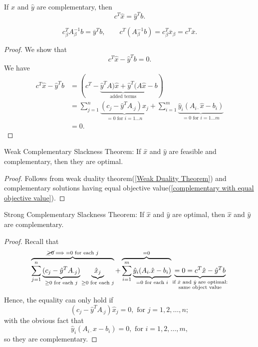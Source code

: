 \begin{theorem}
	\label{complementary with equal objective value}
	If \(\hat{x}\) and \(\hat{y}\) are complementary, then
	\[
		c^{T}\hat{x} = \hat{y}^{T} b.
	\]
\end{theorem}
\begin{note}
	\[
		c^{T}_{\beta} A^{-1}_{\beta}b = \overline{y}^{T} b,\qquad c^{T}(A^{-1}_{\beta} b) = c^{T}_{\beta}\overline{x}_{\beta} = c^{T}\overline{x}.
	\]
\end{note}
\begin{proof}
	We show that
	\[
		c^{T} \hat{x} - \hat{y}^{T} b = 0.
	\]
	We have
	\[
		\begin{split}
			c^{T} \hat{x} - \hat{y}^{T} b &= (c^{T} - \underbrace{\hat{y}^{T}A)\hat{x} + \hat{y}^{T}(A \hat{x}}_{\text{added terms}} - b)\\
			&=\sum\limits_{j=1}^{n} \underbrace{(c_{j}-\hat{y}^{T}A_{\cdot j})x_{j}}_{ = 0\text{ for }i = 1\ldots n}
			+ \sum\limits_{i=1}^{m} \underbrace{\hat{y}_i(A_{i\cdot}\hat{x} - b_{i})}_{ = 0\text{ for }i = 1\ldots m}\\
			&= 0.
		\end{split}
	\]
\end{proof}

\begin{theorem}
	\label{Weak Complementary Slackness}
	Weak Complementary Slackness Theorem: If \(\hat{x}\) and \(\hat{y}\) are feasible and complementary, then they are optimal.
\end{theorem}
\begin{proof}
	Follows from weak duality theorem(\autoref{Weak Duality Theorem}) and complementary solutions having equal objective value(\autoref{complementary with equal objective value}).
\end{proof}

\begin{theorem}
	\label{Strong Complementary Slackness}
	Strong Complementary Slackness Theorem: If \(\hat{x}\) and \(\hat{y}\) are optimal, then \(\hat{x}\) and \(\hat{y}\) are complementary.
\end{theorem}
\begin{proof}
	Recall that
	\[
		\overbrace{\sum\limits_{j=1}^{n} \underbrace{(c_{j}-\hat{y}^{T}A_{\cdot j})}_{ \geq 0\text{ for each }j}\underbrace{\hat{x}_{j}}_{\geq 0 \text{ for each }j}}^{\cancel{\geq 0}\implies = 0\text{ for each }j}
		+ \overbrace{\sum\limits_{i=1}^{m} \underbrace{\hat{y}_i(A_{i\cdot}\hat{x} - b_{i})}_{ = 0\text{ for each }i}}^{=0}
		\underbrace{= 0 = c^{T}\hat{x} - \hat{y}^{T}b}_{\substack{\text{if }\hat{x}\text{ and }\hat{y}\text{ are optimal:}\\ \text{same object value}}}
	\]
	Hence, the equality can only hold if
	\[
		(c_{j} - \hat{y}^{T}A_{\cdot j})\hat{x}_j = 0, \text{ for }j = 1, 2, \ldots , n;
	\]
	with the obvious fact that
	\[
		\hat{y}_i(A_{i\cdot}\hat{x} - b_{i}) = 0, \text{ for }i = 1, 2, \ldots , m,
	\]
	so they are complementary.
\end{proof}

